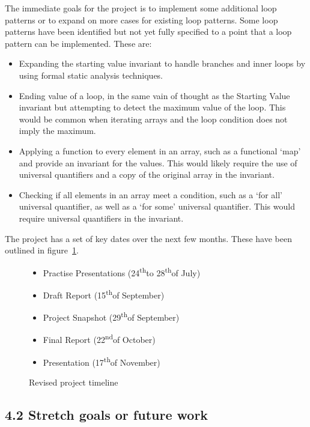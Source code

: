 \documentclass[11pt, a4paper, twoside, openright]{report}
\newcommand{\snd}{\textsuperscript{nd}}
\newcommand{\sth}{\textsuperscript{th}}
\begin{document}
The immediate goals for the project is to implement some additional loop
patterns or to expand on more cases for existing loop patterns.
Some loop patterns have been identified but not yet
fully specified to a point that a loop pattern can be implemented.
These are:
\begin{itemize}
    \item Expanding the starting value invariant to handle branches
        and inner loops by using formal static analysis techniques.
    \item Ending value of a loop, in the same vain of thought as the Starting
        Value invariant but attempting to detect the maximum value of the loop.
        This would be common when iterating arrays and the loop condition does
        not imply the maximum.
    \item Applying a function to every element in an array, such as a
        functional `map' and provide an invariant for the values.
        This would likely require the use of universal quantifiers
        and a copy of the original array in the invariant.
    \item Checking if all elements in an array meet a condition, such as
        a `for all' universal quantifier, as well as a `for some' universal
        quantifier.
        This would require universal quantifiers in the invariant.
\end{itemize}

The project has a set of key dates over the next few months.
These have been outlined in figure~\ref{list:timeline}.

\begin{figure}[ht]
    \begin{itemize}
        \item Practise Presentations (24\sth to 28\sth of July)
        \item Draft Report (15\sth of September)
        \item Project Snapshot (29\sth of September)
        \item Final Report (22\snd of October)
        \item Presentation (17\sth of November)
    \end{itemize}
    \caption{Revised project timeline}\label{list:timeline}
\end{figure}

\subsection*{4.2 Stretch goals or future work}
\end{document}
